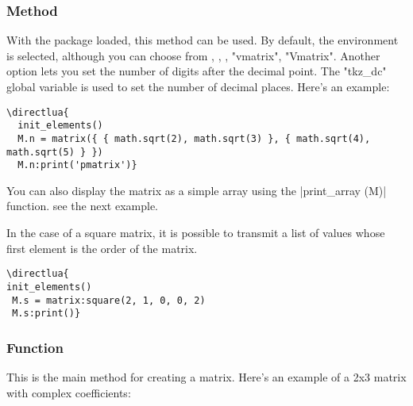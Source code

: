 \subsubsection{Method  }
\label{ssub:method_print}

With the  package loaded, this method can be used. By default, the  environment is selected, although you can choose from , , , "vmatrix", "Vmatrix". Another option lets you set the number of digits after the decimal point. The "tkz\_dc" global variable is used to set the number of decimal places. Here's an example:

\vspace{.5em}
\begin{verbatim}
\directlua{
  init_elements()
  M.n = matrix({ { math.sqrt(2), math.sqrt(3) }, { math.sqrt(4), math.sqrt(5) } })
  M.n:print('pmatrix')}
\end{verbatim}



\vspace{.5em}
You can also display the matrix as a simple array using the |print_array (M)| function. see  the next example.

In the case of a square matrix, it is possible to transmit a list of values whose first element is the order of the matrix.

\vspace{.5em}
\begin{minipage}{.5\textwidth}
\begin{verbatim}
\directlua{
init_elements()
 M.s = matrix:square(2, 1, 0, 0, 2)
 M.s:print()}
  \end{verbatim}
\end{minipage}
\begin{minipage}{.5\textwidth}
\end{minipage}

\subsubsection{Function }
\label{ssub:method_new}

This is the main method for creating a matrix. Here's an example of a 2x3 matrix with complex coefficients:

